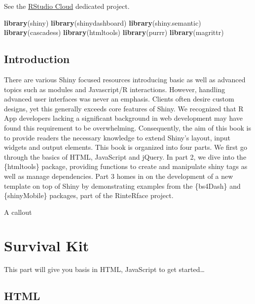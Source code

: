 \documentclass[]{book}
\newenvironment{Shaded}{\begin{snugshade}}{\end{snugshade}}
\newcommand{\KeywordTok}[1]{\textcolor[rgb]{0.13,0.29,0.53}{\textbf{#1}}}
\newcommand{\NormalTok}[1]{#1}
\begin{document}
See the \href{https://rstudio.cloud}{RStudio Cloud} dedicated project.

\begin{Shaded}
\begin{Highlighting}[]
\KeywordTok{library}\NormalTok{(shiny)}
\KeywordTok{library}\NormalTok{(shinydashboard)}
\KeywordTok{library}\NormalTok{(shiny.semantic)}
\KeywordTok{library}\NormalTok{(cascadess)}
\KeywordTok{library}\NormalTok{(htmltools)}
\KeywordTok{library}\NormalTok{(purrr)}
\KeywordTok{library}\NormalTok{(magrittr)}
\end{Highlighting}
\end{Shaded}

\hypertarget{intro}{%
\chapter{Introduction}\label{intro}}

There are various Shiny focused resources introducing basic as well as advanced topics such as modules and Javascript/R interactions. However, handling advanced user interfaces was never an emphasis. Clients often desire custom designs, yet this generally exceeds core features of Shiny. We recognized that R App developers lacking a significant background in web development may have found this requirement to be overwhelming. Consequently, the aim of this book is to provide readers the necessary knowledge to extend Shiny's layout, input widgets and output elements. This book is organized into four parts. We first go through the basics of HTML, JavaScript and jQuery. In part 2, we dive into the \{htmltools\} package, providing functions to create and manipulate shiny tags as well as manage dependencies. Part 3 homes in on the development of a new template on top of Shiny by demonstrating examples from the \{bs4Dash\} and \{shinyMobile\} packages, part of the RinteRface project.

A callout

\hypertarget{part-survival-kit}{%
\part*{Survival Kit}\label{part-survival-kit}}

This part will give you basis in HTML, JavaScript to get started\ldots{}

\hypertarget{survival-kit-html}{%
\chapter{HTML}\label{survival-kit-html}}
\end{document}
